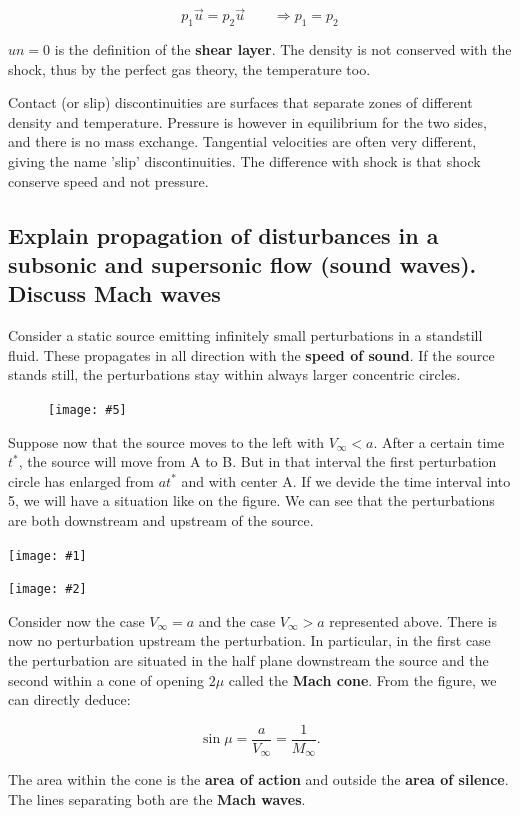 \documentclass[british,french,11pt, a4paper, openany]{article}
\newcommand{\wrapfig}[6]{%
	\begin{figure}%
		\vspace{-5mm}%
		\texttt{[image: \#5]}%
		\captionof{figure}{}%
		\label{#6}%
	\end{figure}%
}
\newcommand{\minifig}[6]{
	\begin{center}%
		\begin{minipage}{#5\textwidth}%
			\texttt{[image: \#1]}%
			\captionof{figure}{}%
			\label{#1}%
		\end{minipage}%
		\begin{minipage}{#6\textwidth}%
			\texttt{[image: \#2]}%
			\captionof{figure}{}%
			\label{#2}%
		\end{minipage}%
	\end{center}
}
\begin{document}
\begin{equation}
p_1 \vec{u} = p_2 \vec{u} \qquad \Rightarrow p_1 = p_2
\end{equation}

$un = 0$ is the definition of the \textbf{shear layer}. The density is not conserved with the shock, thus by the perfect gas theory, the temperature too. 

Contact (or slip) discontinuities are surfaces that separate zones of different density and temperature. Pressure is however in equilibrium for the two sides, and there is no mass exchange. Tangential velocities are often very different, giving the name 'slip' discontinuities. The difference with shock is that shock conserve speed and not pressure.

\subsection{Explain propagation of disturbances in a subsonic and supersonic flow (sound waves). Discuss Mach waves}

Consider a static source emitting infinitely small perturbations in a standstill fluid. These propagates in all direction with the \textbf{speed of sound}. If the source stands still, the perturbations stay within always larger concentric circles. 

\wrapfig{7}{l}{3}{0.1}{ch8/2}{ch8/2}
Suppose now that the source moves to the left with $V_\infty < a$. After a certain time $t^*$, the source will move from A to B. But in that interval the first perturbation circle has enlarged from $at^*$ and with center A. If we devide the time interval into 5, we will have a situation like on the figure. We can see that the perturbations are both downstream and upstream of the source.  

\minifig{ch8/3}{ch8/4}{0.5}{0.4}{0.3}{0.3}

Consider now the case $V_\infty = a$ and the case $V_\infty > a$ represented above. There is now no perturbation upstream the perturbation. In particular, in the first case the perturbation are situated in the half plane downstream the source and the second within a cone of opening $2\mu$ called the \textbf{Mach cone}. From the figure, we can directly deduce: 

\begin{equation}
\sin \mu = \frac{a}{V_\infty} = \frac{1}{M_\infty}.
\end{equation}

The area within the cone is the \textbf{area of action} and outside the \textbf{area of silence}. The lines separating both are the \textbf{Mach waves}.
\end{document}
